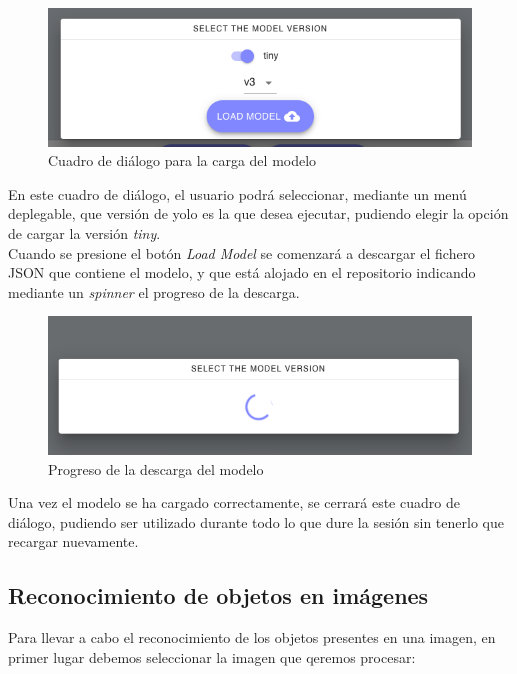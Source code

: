 \documentclass[a4paper]{article}
\begin{document}
\begin{figure}[ht]
    \centering
    \includegraphics[scale=0.4]{images/model-loader.png}
    \caption{Cuadro de diálogo para la carga del modelo}
    \label{fig:my_label}
\end{figure}

En este cuadro de diálogo, el usuario podrá seleccionar, mediante un menú deplegable, que versión de 
yolo es la que desea ejecutar, pudiendo elegir la opción de cargar la versión \textit{tiny}. \\

Cuando se presione el botón \textit{Load Model} se comenzará a descargar el fichero
JSON que contiene el modelo, y que está alojado en el repositorio indicando mediante un \textit{spinner} el progreso de la descarga. \\

\begin{figure}[ht]
    \centering
    \includegraphics[scale=0.4]{images/model-loading.png}
    \caption{Progreso de la descarga del modelo}
    \label{fig:my_label}
\end{figure}

Una vez el modelo se ha cargado correctamente, se cerrará este cuadro de diálogo, pudiendo ser 
utilizado durante todo lo que dure la sesión sin tenerlo que recargar nuevamente.

\subsection{Reconocimiento de objetos en imágenes}
Para llevar a cabo el reconocimiento de los objetos presentes en una imagen, en primer lugar debemos
seleccionar la imagen que qeremos procesar: \\
\end{document}
